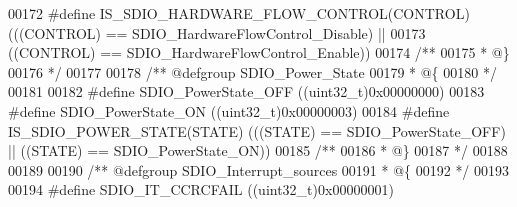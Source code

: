 \begin{DoxyCode}
00172 \textcolor{preprocessor}{#}\textcolor{preprocessor}{define} \textcolor{preprocessor}{IS\_SDIO\_HARDWARE\_FLOW\_CONTROL}\textcolor{preprocessor}{(}\textcolor{preprocessor}{CONTROL}\textcolor{preprocessor}{)} \textcolor{preprocessor}{(}\textcolor{preprocessor}{(}\textcolor{preprocessor}{(}\textcolor{preprocessor}{CONTROL}\textcolor{preprocessor}{)} \textcolor{preprocessor}{==} 
      SDIO_HardwareFlowControl_Disable\textcolor{preprocessor}{)} \textcolor{preprocessor}{||}
00173                                                 \textcolor{preprocessor}{(}\textcolor{preprocessor}{(}\textcolor{preprocessor}{CONTROL}\textcolor{preprocessor}{)} \textcolor{preprocessor}{==} 
      SDIO_HardwareFlowControl_Enable\textcolor{preprocessor}{)}\textcolor{preprocessor}{)}
00174 \textcolor{comment}{/**}
00175 \textcolor{comment}{  * @\}}
00176 \textcolor{comment}{  */}
00177 
00178 \textcolor{comment}{/** @defgroup SDIO\_Power\_State }
00179 \textcolor{comment}{  * @\{}
00180 \textcolor{comment}{  */}
00181 
00182 \textcolor{preprocessor}{#}\textcolor{preprocessor}{define} \textcolor{preprocessor}{SDIO\_PowerState\_OFF}                 \textcolor{preprocessor}{(}\textcolor{preprocessor}{(}\textcolor{preprocessor}{uint32\_t}\textcolor{preprocessor}{)}0x00000000\textcolor{preprocessor}{)}
00183 \textcolor{preprocessor}{#}\textcolor{preprocessor}{define} \textcolor{preprocessor}{SDIO\_PowerState\_ON}                  \textcolor{preprocessor}{(}\textcolor{preprocessor}{(}\textcolor{preprocessor}{uint32\_t}\textcolor{preprocessor}{)}0x00000003\textcolor{preprocessor}{)}
00184 \textcolor{preprocessor}{#}\textcolor{preprocessor}{define} \textcolor{preprocessor}{IS\_SDIO\_POWER\_STATE}\textcolor{preprocessor}{(}\textcolor{preprocessor}{STATE}\textcolor{preprocessor}{)} \textcolor{preprocessor}{(}\textcolor{preprocessor}{(}\textcolor{preprocessor}{(}\textcolor{preprocessor}{STATE}\textcolor{preprocessor}{)} \textcolor{preprocessor}{==} SDIO_PowerState_OFF\textcolor{preprocessor}{)} \textcolor{preprocessor}{||} \textcolor{preprocessor}{(}\textcolor{preprocessor}{(}\textcolor{preprocessor}{STATE}\textcolor{preprocessor}{)} \textcolor{preprocessor}{==} 
      SDIO_PowerState_ON\textcolor{preprocessor}{)}\textcolor{preprocessor}{)}
00185 \textcolor{comment}{/**}
00186 \textcolor{comment}{  * @\}}
00187 \textcolor{comment}{  */}
00188 
00189 
00190 \textcolor{comment}{/** @defgroup SDIO\_Interrupt\_sources}
00191 \textcolor{comment}{  * @\{}
00192 \textcolor{comment}{  */}
00193 
00194 \textcolor{preprocessor}{#}\textcolor{preprocessor}{define} \textcolor{preprocessor}{SDIO\_IT\_CCRCFAIL}                    \textcolor{preprocessor}{(}\textcolor{preprocessor}{(}\textcolor{preprocessor}{uint32\_t}\textcolor{preprocessor}{)}0x00000001\textcolor{preprocessor}{)}

\end{DoxyCode}
